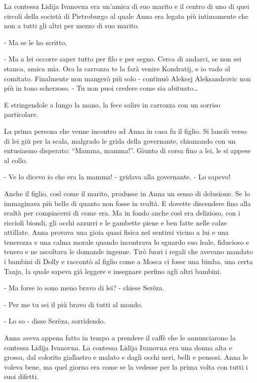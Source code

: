 La contessa Lidija Ivanovna era un'amica di suo marito e il centro di uno di quei circoli della società di Pietroburgo al quale Anna era legata più intimamente che non a tutti gli altri per mezzo di suo marito. 

- Ma se le ho scritto. 

- Ma a lei occorre saper tutto per filo e per segno. Cerca di andarci, se non sei stanca, amica mia. Ora la carrozza te la farà venire Kondratij, e io vado al comitato. Finalmente non mangerò più solo - continuò Aleksej Aleksandrovic non più in tono scherzoso. - Tu non puoi credere come sia abituato\ldots{} 

E stringendole a lungo la mano, la fece salire in carrozza con un sorriso particolare. 

La prima persona che venne incontro ad Anna in casa fu il figlio. Si lanciò verso di lei giù per la scala, malgrado le grida della governante, chiamando con un entusiasmo disperato: ``Mamma, mamma!''. Giunto di corsa fino a lei, le si appese al collo. 

- Ve lo dicevo io che era la mamma! - gridava alla governante. - Lo sapevo! 

Anche il figlio, così come il marito, produsse in Anna un senso di delusione. Se lo immaginava più bello di quanto non fosse in realtà. E dovette discendere fino alla realtà per compiacersi di come era. Ma in fondo anche così era delizioso, con i riccioli biondi, gli occhi azzurri e le gambette piene e ben fatte nelle calze attillate. Anna provava una gioia quasi fisica nel sentirsi vicino a lui e una tenerezza e una calma morale quando incontrava lo sguardo suo leale, fiducioso e tenero e ne ascoltava le domande ingenue. Tirò fuori i regali che avevano mandato i bambini di Dolly e raccontò al figlio come a Mosca ci fosse una bimba, una certa Tanja, la quale sapeva già leggere e insegnare perfino agli altri bambini. 

- Ma forse io sono meno bravo di lei? - chiese Serëza. 

- Per me tu sei il più bravo di tutti al mondo. 

- Lo so - disse Serëza, sorridendo. 

Anna aveva appena fatto in tempo a prendere il caffè che le annunciarono la contessa Lidija Ivanovna. La contessa Lidija Ivanovna era una donna alta e grossa, dal colorito giallastro e malato e dagli occhi neri, belli e pensosi. Anna le voleva bene, ma quel giorno era come se la vedesse per la prima volta con tutti i suoi difetti. 

